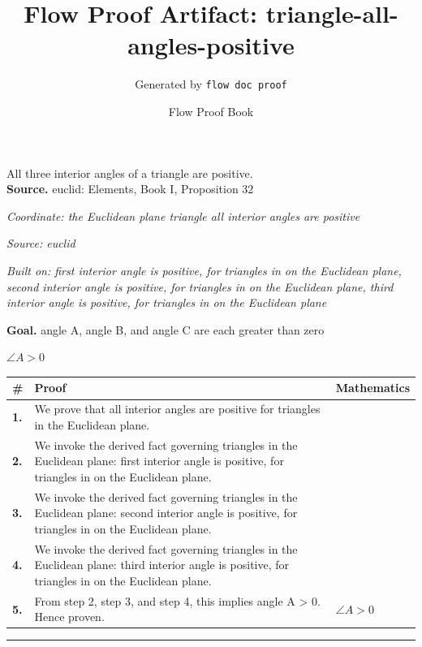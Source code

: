 \documentclass[11pt]{article}
\title{Flow Proof Artifact: triangle-all-angles-positive}
\author{Generated by \texttt{flow doc proof}}
\date{Flow Proof Book}
\theoremstyle{definition}
\begin{document}
\maketitle
All three interior angles of a triangle are positive.\\[0.5em]
\textbf{Source.} euclid: Elements, Book I, Proposition 32\\[0.5em]
\bigskip
{}\par
\smallskip\noindent\textit{Coordinate: the Euclidean plane \cdot triangle \cdot all interior angles are positive}\par
\smallskip\noindent\textit{Source: euclid}\par
\smallskip\noindent\textit{Built on: first interior angle is positive, for triangles in on the Euclidean plane, second interior angle is positive, for triangles in on the Euclidean plane, third interior angle is positive, for triangles in on the Euclidean plane}\par
\medskip
\noindent\textbf{Goal.} angle A, angle B, and angle C are each greater than zero\par
\noindent$\displaystyle \angle A > 0$\par
\medskip
\noindent
\begin{tabular}{@{} >{\raggedright\arraybackslash}p{} >{\raggedright\arraybackslash}p{} >{\raggedleft\arraybackslash}p{} @{}}
\textbf{\#} & \textbf{Proof} & \textbf{Mathematics} \\
\midrule
\textbf{1.} & We prove that all interior angles are positive for triangles in the Euclidean plane. & \\[0.45em]
\textbf{2.} & We invoke the derived fact governing triangles in the Euclidean plane: first interior angle is positive, for triangles in on the Euclidean plane. & \\[0.45em]
\textbf{3.} & We invoke the derived fact governing triangles in the Euclidean plane: second interior angle is positive, for triangles in on the Euclidean plane. & \\[0.45em]
\textbf{4.} & We invoke the derived fact governing triangles in the Euclidean plane: third interior angle is positive, for triangles in on the Euclidean plane. & \\[0.45em]
\textbf{5.} & From step 2, step 3, and step 4, this implies angle A > 0. Hence proven. & $\displaystyle \angle A > 0$ \\[0.45em]
\bottomrule
\end{tabular}
\label{thm:Geometry-triangle-all_interior_angles_are_positive}
\par\medskip\hrule
\end{document}
